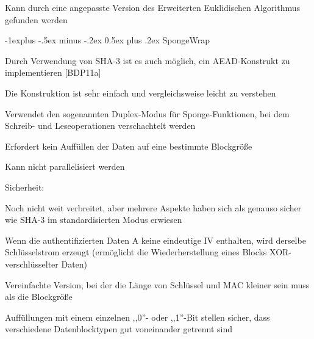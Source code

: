 \documentclass[a4paper]{article}
\makeatletter
\renewcommand{\subsection}{\@startsection{subsection}{2}{0mm}%
 {-1explus -.5ex minus -.2ex}%
 {0.5ex plus .2ex}%
 {\normalfont\normalsize\bfseries}}
\makeatother
\begin{document}
\begin{multicols}{3}
\begin{itemize*}
            \begin{itemize*}
                  \item Kann durch eine angepasste Version des Erweiterten Euklidischen Algorithmus gefunden werden
            \end{itemize*}
      \end{itemize*}


      \subsection{SpongeWrap}

      \begin{itemize*}
            \item
            Durch Verwendung von SHA-3 ist es auch möglich, ein AEAD-Konstrukt zu
            implementieren {[}BDP11a{]}
            \item
            Die Konstruktion ist sehr einfach und vergleichsweise leicht zu
            verstehen
            \item
            Verwendet den sogenannten Duplex-Modus für Sponge-Funktionen, bei dem
            Schreib- und Leseoperationen verschachtelt werden
            \item
            Erfordert kein Auffüllen der Daten auf eine bestimmte Blockgröße
            \item
            Kann nicht parallelisiert werden
            \item
            Sicherheit:

            \begin{itemize*}
                  \item Noch nicht weit verbreitet, aber mehrere Aspekte haben sich als genauso sicher wie SHA-3 im standardisierten Modus erwiesen
                  \item Wenn die authentifizierten Daten A keine eindeutige IV enthalten, wird derselbe Schlüsselstrom erzeugt (ermöglicht die Wiederherstellung eines Blocks XOR-verschlüsselter Daten)
            \end{itemize*}

            \begin{itemize*}
                  \item Vereinfachte Version, bei der die Länge von Schlüssel und MAC kleiner sein muss als die Blockgröße
                  \item Auffüllungen mit einem einzelnen ,,0''- oder ,,1''-Bit stellen sicher, dass verschiedene Datenblocktypen gut voneinander getrennt sind
            \end{itemize*}
      \end{itemize*}



\end{multicols}
\end{document}
